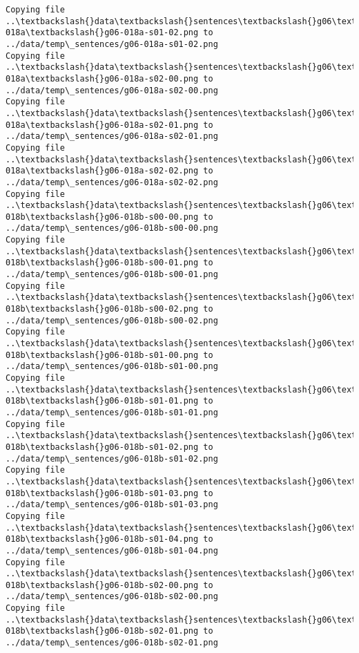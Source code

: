 \documentclass[11pt]{article}
\begin{document}
\begin{Verbatim}[commandchars=\\\{\}]
Copying file ..\textbackslash{}data\textbackslash{}sentences\textbackslash{}g06\textbackslash{}g06-018a\textbackslash{}g06-018a-s01-02.png to
../data/temp\_sentences/g06-018a-s01-02.png
Copying file ..\textbackslash{}data\textbackslash{}sentences\textbackslash{}g06\textbackslash{}g06-018a\textbackslash{}g06-018a-s02-00.png to
../data/temp\_sentences/g06-018a-s02-00.png
Copying file ..\textbackslash{}data\textbackslash{}sentences\textbackslash{}g06\textbackslash{}g06-018a\textbackslash{}g06-018a-s02-01.png to
../data/temp\_sentences/g06-018a-s02-01.png
Copying file ..\textbackslash{}data\textbackslash{}sentences\textbackslash{}g06\textbackslash{}g06-018a\textbackslash{}g06-018a-s02-02.png to
../data/temp\_sentences/g06-018a-s02-02.png
Copying file ..\textbackslash{}data\textbackslash{}sentences\textbackslash{}g06\textbackslash{}g06-018b\textbackslash{}g06-018b-s00-00.png to
../data/temp\_sentences/g06-018b-s00-00.png
Copying file ..\textbackslash{}data\textbackslash{}sentences\textbackslash{}g06\textbackslash{}g06-018b\textbackslash{}g06-018b-s00-01.png to
../data/temp\_sentences/g06-018b-s00-01.png
Copying file ..\textbackslash{}data\textbackslash{}sentences\textbackslash{}g06\textbackslash{}g06-018b\textbackslash{}g06-018b-s00-02.png to
../data/temp\_sentences/g06-018b-s00-02.png
Copying file ..\textbackslash{}data\textbackslash{}sentences\textbackslash{}g06\textbackslash{}g06-018b\textbackslash{}g06-018b-s01-00.png to
../data/temp\_sentences/g06-018b-s01-00.png
Copying file ..\textbackslash{}data\textbackslash{}sentences\textbackslash{}g06\textbackslash{}g06-018b\textbackslash{}g06-018b-s01-01.png to
../data/temp\_sentences/g06-018b-s01-01.png
Copying file ..\textbackslash{}data\textbackslash{}sentences\textbackslash{}g06\textbackslash{}g06-018b\textbackslash{}g06-018b-s01-02.png to
../data/temp\_sentences/g06-018b-s01-02.png
Copying file ..\textbackslash{}data\textbackslash{}sentences\textbackslash{}g06\textbackslash{}g06-018b\textbackslash{}g06-018b-s01-03.png to
../data/temp\_sentences/g06-018b-s01-03.png
Copying file ..\textbackslash{}data\textbackslash{}sentences\textbackslash{}g06\textbackslash{}g06-018b\textbackslash{}g06-018b-s01-04.png to
../data/temp\_sentences/g06-018b-s01-04.png
Copying file ..\textbackslash{}data\textbackslash{}sentences\textbackslash{}g06\textbackslash{}g06-018b\textbackslash{}g06-018b-s02-00.png to
../data/temp\_sentences/g06-018b-s02-00.png
Copying file ..\textbackslash{}data\textbackslash{}sentences\textbackslash{}g06\textbackslash{}g06-018b\textbackslash{}g06-018b-s02-01.png to
../data/temp\_sentences/g06-018b-s02-01.png

\end{Verbatim}
\end{document}
